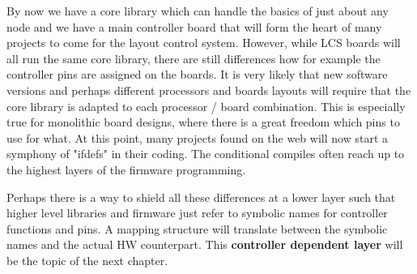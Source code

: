 By now we have a core library which can handle the basics of just about any node and we have a main controller board that will form the heart of many projects to come for the layout control system. However, while LCS boards will all run the same core library, there are still differences how for example the controller pins are assigned on the boards. It is very likely that new software versions and perhaps different processors and boards layouts will require that the core library is adapted to each processor / board combination. This is especially true for monolithic board designs, where there is a great freedom which pins to use for what. At this point, many projects found on the web will now start a symphony of "ifdefs" in their coding. The conditional compiles often reach up to the highest layers of the firmware programming. 

Perhaps there is a way to shield all these differences at a lower layer such that higher level libraries and firmware just refer to symbolic names for controller functions and pins. A mapping structure will translate between the symbolic names and the actual HW counterpart. This \textbf{controller dependent layer} will be the topic of the next chapter.
